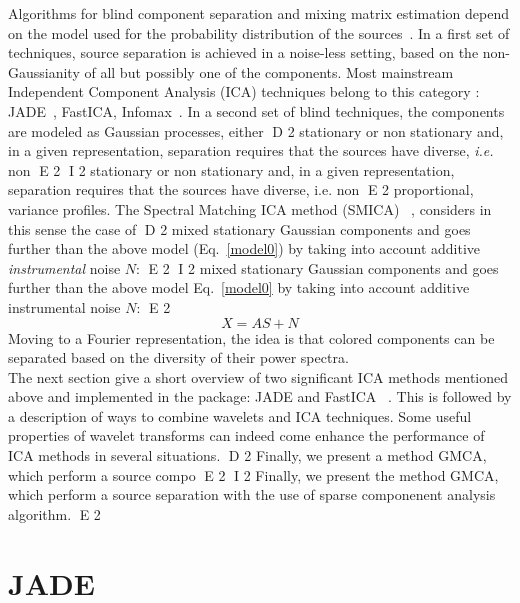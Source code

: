 Algorithms for blind component separation and mixing matrix estimation depend on the model used for the probability distribution 
of the sources~\citep{ica:3easy}. In a first set of techniques, source separation is achieved in a noise-less setting, based on the 
non-Gaussianity of all but possibly one of the components. Most mainstream Independent Component Analysis (ICA)  techniques belong to this category : JADE~\citep{ica:jade}, 
FastICA, Infomax~\citep{ica:icabook}. In a second set of blind techniques, the components are modeled as Gaussian processes, either 
D 2
stationary or non stationary and, in a given representation, separation requires that the sources have diverse, \emph{i.e.} non 
E 2
I 2
stationary or non stationary and, in a given representation, separation requires that the sources have diverse, i.e. non 
E 2
proportional, variance profiles. The Spectral Matching ICA method (SMICA) ~\citep{ica:Del2003}, considers in this sense the case of 
D 2
mixed stationary Gaussian components and goes further than the above model (Eq.~\ref{model0}) by taking into account additive 
\emph{instrumental } noise $N$:
E 2
I 2
mixed stationary Gaussian components and goes further than the above model Eq.~\eqref{model0} by taking into account additive 
instrumental noise $N$:
E 2
\begin{equation}\label{model1}
X = A S + N
\end{equation}
Moving to a Fourier representation, the idea is that colored components can be separated based on the diversity of their power spectra.\\ 
 
The next  section give a short overview of two significant ICA methods mentioned above and implemented in the \mrs package: 
JADE  and FastICA ~\citep{ica:icabook}. 
This is followed by a description of ways to 
combine wavelets and ICA techniques. Some useful properties of wavelet transforms can indeed come enhance the performance of ICA  methods in several situations. 
D 2
Finally, we present a method GMCA, which perform a source compo
E 2
I 2
Finally, we present the method GMCA, which perform a source separation with the use of sparse componenent analysis algorithm.
E 2
    
\section{JADE}

